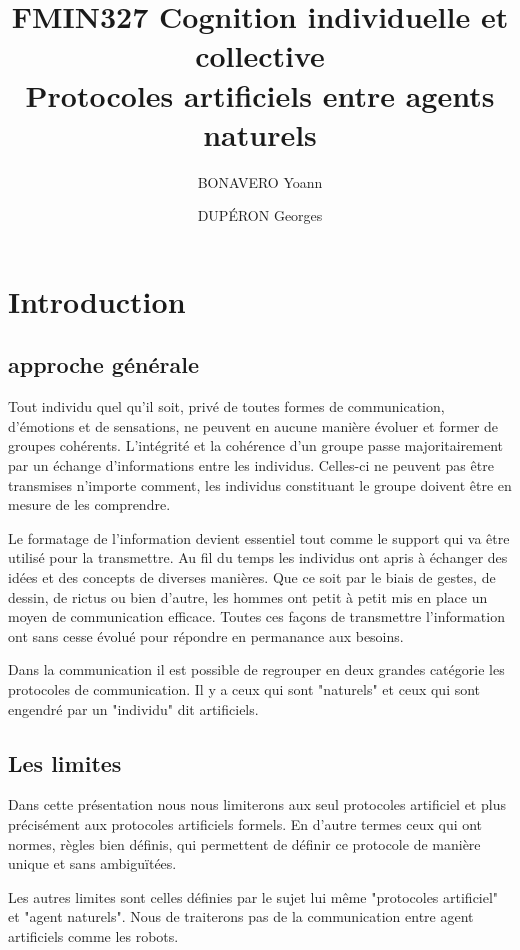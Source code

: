\documentclass[french,a4paper]{article}
\title{FMIN327 Cognition individuelle et collective\\ Protocoles artificiels entre agents naturels}
\author{BONAVERO Yoann \and DUPÉRON Georges}
\begin{document}
\maketitle
\tableofcontents
\newpage

\section{Introduction}
\subsection{approche générale}
Tout individu quel qu'il soit, privé de toutes formes de communication, 
d'émotions et de sensations, ne peuvent en aucune manière évoluer et 
former de groupes cohérents. L'intégrité et la cohérence d'un groupe 
passe majoritairement par un échange d'informations entre les individus.
Celles-ci ne peuvent pas être transmises n'importe comment, les individus 
constituant le groupe doivent être en mesure de les comprendre. 

Le formatage de l'information devient essentiel tout comme le 
support qui va être utilisé pour la transmettre.
Au fil du temps les individus ont apris à échanger des idées et des 
concepts de diverses manières. Que ce soit par le biais de gestes, de 
dessin, de rictus ou bien d'autre, les hommes ont petit à petit mis en 
place un moyen de communication efficace. Toutes ces façons de 
transmettre l'information ont sans cesse évolué pour répondre en 
permanance aux besoins.

Dans la communication il est possible de regrouper en deux grandes 
catégorie les protocoles de communication. Il y a ceux qui sont 
"naturels" et ceux qui sont engendré par un "individu" dit artificiels.

\subsection{Les limites}
Dans cette présentation nous nous limiterons aux seul protocoles 
artificiel et plus précisément aux protocoles artificiels formels. En 
d'autre termes ceux qui ont normes, règles bien définis, qui permettent 
de définir ce protocole de manière unique et sans ambiguïtées.

Les autres limites sont celles définies par le sujet lui même 
"protocoles artificiel" et "agent naturels". Nous de traiterons pas de 
la communication entre agent artificiels comme les robots.

\newpage
\end{document}
